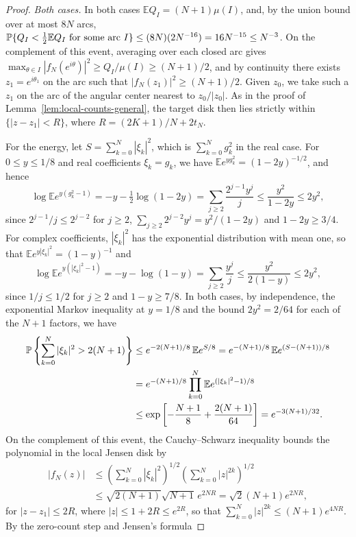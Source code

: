 \begin{proof}
\emph{Both cases.}
In both cases $\mathbb EQ_I=(N+1)\mu(I)$, and, by the union bound over at
most $8N$ arcs,
$\mathbb P\{Q_I<\tfrac12\mathbb EQ_I\text{ for some arc }I\}
 \le(8N)(2N^{-16})=16N^{-15}\le N^{-3}$.
On the complement of this event, averaging over each closed arc gives
$\max_{\theta\in I}|f_N(e^{i\theta})|^2\ge Q_I/\mu(I)\ge(N+1)/2$,
and by continuity there exists $z_1=e^{i\theta_1}$ on the arc such that
$|f_N(z_1)|^2\ge(N+1)/2$.
Given $z_0$, we take such a $z_1$ on the arc of the angular center
nearest to $z_0/|z_0|$. As in the proof of
Lemma~\ref{lem:local-counts-general}, the target disk then lies strictly
within $\{|z-z_1|<R\}$, where $R=(2K+1)/N+2t_N$.

For the energy, let $S=\sum_{k=0}^N|\xi_k|^2$, which is
$\sum_{k=0}^Ng_k^2$ in the real case.
For $0\le y\le1/8$ and real coefficients $\xi_k=g_k$, we have
$\mathbb Ee^{yg_k^2}=(1-2y)^{-1/2}$, and hence
\[
 \log\mathbb Ee^{y(g_k^2-1)}
 =-y-\tfrac12\log(1-2y)
 =\sum_{j\ge2}\frac{2^{j-1}y^j}{j}
 \le\frac{y^2}{1-2y}\le2y^2,
\]
since $2^{j-1}/j\le2^{j-2}$ for $j\ge2$,
$\sum_{j\ge2}2^{j-2}y^j=y^2/(1-2y)$ and $1-2y\ge3/4$.
For complex coefficients, $|\xi_k|^2$ has the exponential distribution
with mean one, so that $\mathbb Ee^{y|\xi_k|^2}=(1-y)^{-1}$ and
\[
 \log\mathbb Ee^{y(|\xi_k|^2-1)}
 =-y-\log(1-y)
 =\sum_{j\ge2}\frac{y^j}{j}
 \le\frac{y^2}{2(1-y)}\le2y^2,
\]
since $1/j\le1/2$ for $j\ge2$ and $1-y\ge7/8$.
In both cases, by independence, the exponential Markov inequality at
$y=1/8$ and the bound $2y^2=2/64$ for each of the $N+1$ factors, we have
\begin{align*}
 \mathbb P\left\{\sum_{k=0}^N|\xi_k|^2>2(N+1)\right\}
 &\le e^{-2(N+1)/8}\,\mathbb Ee^{S/8}
 =e^{-(N+1)/8}\,\mathbb Ee^{(S-(N+1))/8}\\
 &=e^{-(N+1)/8}\prod_{k=0}^N\mathbb Ee^{(|\xi_k|^2-1)/8}\\
 &\le\exp\left[-\frac{N+1}8+\frac{2(N+1)}{64}\right]
 =e^{-3(N+1)/32}.
\end{align*}
On the complement of this event, the Cauchy--Schwarz inequality bounds the
polynomial in the local Jensen disk by
\begin{align*}
 |f_N(z)|&\le\left(\sum_{k=0}^N|\xi_k|^2\right)^{1/2}
 \left(\sum_{k=0}^N|z|^{2k}\right)^{1/2}\\
 &\le\sqrt{2(N+1)}\sqrt{N+1}\,e^{2NR}
 =\sqrt2(N+1)e^{2NR},
\end{align*}
for $|z-z_1|\le2R$, where $|z|\le1+2R\le e^{2R}$, so that
$\sum_{k=0}^N|z|^{2k}\le(N+1)e^{4NR}$.
By the zero-count step \cite[\S8.21]{Titchmarsh1939} and Jensen's formula

\end{proof}
